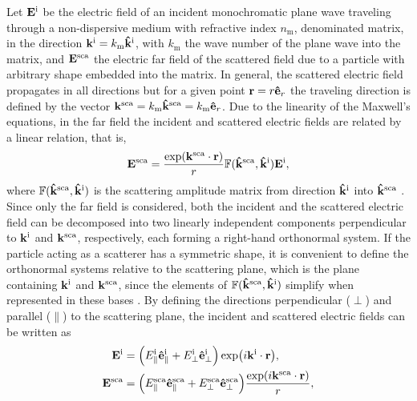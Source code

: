 
Let $\vb{E}^\text{i}$ be the electric field of an incident monochromatic plane wave  traveling through a non-dispersive medium with refractive index $n_\text{m}$, denominated matrix, in the direction $\vb{k}^\text{i} = k_\text{m}\vu{k}^\text{i}$, with $k_\text{m}$ the wave number of the plane wave into the matrix, and $\vb{E}^\text{sca}$ the electric far field of the scattered field due to a particle with arbitrary shape embedded into the matrix. In general, the scattered electric field propagates in all directions but for a given point $\vb{r} = r\vu{e}_r$ the traveling direction is defined by the vector $\vb{k}^\text{sca} = k_\text{m}\vu{k}^\text{sca} = k_\text{m}\vu{e}_r$.  Due to the linearity of the Maxwell's equations, in the far field  the incident and scattered electric fields are related by a linear relation, that is, 
%
\begin{equation}
	\vb{E}^\text{sca} = \frac{\exp(\vb{k}^\text{sca}\cdot\vb{r})}{r} \mathbb{F}(\vu{k}^\text{sca}, \vu{k}^\text{i}) \vb{E}^\text{i},
	\label{eq:ScatAmpMat}
\end{equation}
%
where $\mathbb{F}(\vu{k}^\text{sca}, \vu{k}^\text{i})$ is the scattering  amplitude matrix from direction $\vu{k}^\text{i}$ into $\vu{k}^\text{sca}$ \cite{tsang_scattering_2000}. Since only the far field is considered, both the incident and the scattered electric field can be decomposed into two linearly independent components perpendicular to $\vb{k}^\text{i}$ and $\vb{k}^\text{sca}$, respectively, each forming a right-hand orthonormal system. If the particle acting as a scatterer has a symmetric shape, it is convenient to define the orthonormal systems relative to the scattering plane, which is the plane containing $\vb{k}^\text{i}$ and $\vb{k}^\text{sca}$, since the elements of $\mathbb{F}(\vu{k}^\text{sca}, \vu{k}^\text{i})$ simplify when represented in these bases \cite{tsang_scattering_2000}. By defining the directions perpendicular  ($\perp$) and parallel ($\parallel$) to the scattering plane, the incident and scattered electric fields can be written as
%
\begin{align}
	\vb{E}^\text{i} & = \qty(E_\parallel^\text{i}\vu{e}^\text{i}_\parallel + E_\perp^\text{i} \vu{e}_\perp^\text{i}) \exp(i\vb{k}^\text{i}\cdot\vb{r}),
	\label{eq:Ei} \\
	\vb{E}^\text{sca} & = \qty(E_\parallel^\text{sca}\vu{e}^\text{sca}_\parallel + E_\perp^\text{sca} \vu{e}_\perp^\text{sca}) \frac{\exp(i\vb{k}^\text{sca}\cdot\vb{r})}{r},
	\label{eq:Es}
\end{align}
